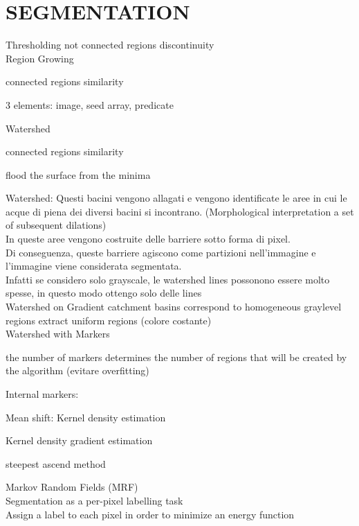\documentclass[11pt,english]{article}
\begin{document}
\section{SEGMENTATION}

Thresholding \makebox[0.5cm]{\textrightarrow} not connected regions \makebox[0.5cm]{\textrightarrow} discontinuity \\

Region Growing\par
    \makebox[1.5cm]{\textrightarrow} connected regions \makebox[0.5cm]{\textrightarrow} similarity \par
    \makebox[1.5cm]{\textrightarrow} 3 elements: image, seed array, predicate \par

Watershed\par
    \makebox[1.5cm]{\textrightarrow} connected regions \makebox[0.5cm]{\textrightarrow} similarity\par
    \makebox[1.5cm]{\textrightarrow} flood the surface from the minima\par
\medskip
Watershed: Questi bacini vengono allagati e vengono identificate le aree in cui le acque di piena dei diversi bacini si incontrano. (Morphological interpretation \makebox[0.5cm]{\textrightarrow} a set of subsequent dilations) \\
In queste aree vengono costruite delle barriere sotto forma di pixel. \\
Di conseguenza, queste barriere agiscono come partizioni nell'immagine e l'immagine viene considerata segmentata. \\
\makebox[0.5cm]{\textrightarrow} Infatti se considero solo grayscale, le watershed lines possonono essere molto spesse, in questo modo ottengo solo delle lines \\
\medskip
Watershed on Gradient \makebox[0.5cm]{\textrightarrow} catchment basins correspond to homogeneous graylevel regions \makebox[0.5cm]{\textrightarrow} extract uniform regions (colore costante) \\
\medskip
Watershed with Markers\par
    \makebox[1.5cm]{\textrightarrow} the number of markers determines the number of regions that will be created by the algorithm (evitare overfitting)\par
    \makebox[1.5cm]{\textrightarrow} Internal markers:\par 
\medskip
Mean shift: Kernel density estimation\par
    \makebox[1.5cm]{\textrightarrow} Kernel density gradient estimation\par
    \makebox[1.5cm]{\textrightarrow} steepest ascend method\par
\medskip
Markov Random Fields (MRF) \\
Segmentation as a per-pixel labelling task \\
Assign a label to each pixel in order to minimize an energy function \\
\end{document}
